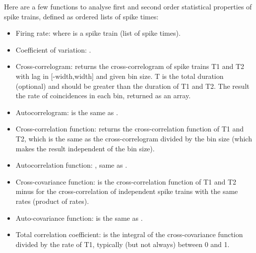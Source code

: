\documentclass[letterpaper,10pt,english]{manual}
\begin{document}
Here are a few functions to analyse first and second order statistical properties
of spike trains, defined as ordered lists of spike times:
\begin{itemize}
\item {} 
Firing rate:  where  is a spike train (list of spike times).

\item {} 
Coefficient of variation: .

\item {} 
Cross-correlogram:  returns
the cross-correlogram of spike trains T1 and T2 with lag in {[}-width,width{]} and given bin size.
T is the total duration (optional) and should be greater than the duration of T1 and T2.
The result the rate of coincidences in each bin, returned as an array.

\item {} 
Autocorrelogram:  is the same as
.

\item {} 
Cross-correlation function:  returns the cross-correlation
function of T1 and T2, which is the same as the cross-correlogram divided by the bin size (which makes the
result independent of the bin size).

\item {} 
Autocorrelation function: , same as
.

\item {} 
Cross-covariance function:  is the cross-correlation
function of T1 and T2 minus for the cross-correlation of independent spike trains with the same rates
(product of rates).

\item {} 
Auto-covariance function:  is the same as
.

\item {} 
Total correlation coefficient:  is
the integral of the cross-covariance function divided by the rate of T1, typically (but not
always) between 0 and 1.

\end{itemize}
\end{document}
